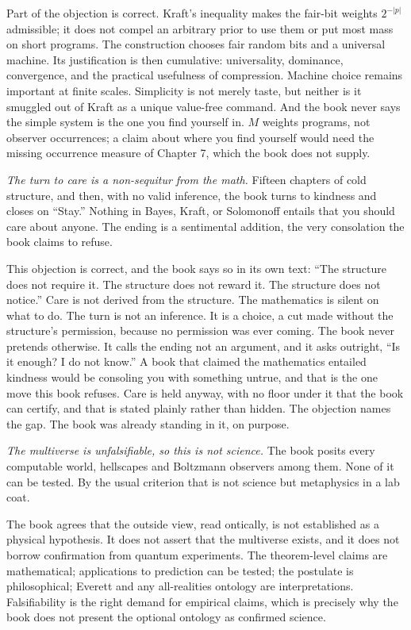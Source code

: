Part of the objection is correct. Kraft's inequality makes the fair-bit weights $2^{-|p|}$ admissible; it does not compel an arbitrary prior to use them or put most mass on short programs. The construction chooses fair random bits and a universal machine. Its justification is then cumulative: universality, dominance, convergence, and the practical usefulness of compression. Machine choice remains important at finite scales. Simplicity is not merely taste, but neither is it smuggled out of Kraft as a unique value-free command. And the book never says the simple system is the one you find yourself in. $M$ weights programs, not observer occurrences; a claim about where you find yourself would need the missing occurrence measure of Chapter 7, which the book does not supply.

\emph{The turn to care is a non-sequitur from the math.} Fifteen chapters of cold structure, and then, with no valid inference, the book turns to kindness and closes on ``Stay.'' Nothing in Bayes, Kraft, or Solomonoff entails that you should care about anyone. The ending is a sentimental addition, the very consolation the book claims to refuse.

This objection is correct, and the book says so in its own text: ``The structure does not require it. The structure does not reward it. The structure does not notice.'' Care is not derived from the structure. The mathematics is silent on what to do. The turn is not an inference. It is a choice, a cut made without the structure's permission, because no permission was ever coming. The book never pretends otherwise. It calls the ending not an argument, and it asks outright, ``Is it enough? I do not know.'' A book that claimed the mathematics entailed kindness would be consoling you with something untrue, and that is the one move this book refuses. Care is held anyway, with no floor under it that the book can certify, and that is stated plainly rather than hidden. The objection names the gap. The book was already standing in it, on purpose.

\emph{The multiverse is unfalsifiable, so this is not science.} The book posits every computable world, hellscapes and Boltzmann observers among them. None of it can be tested. By the usual criterion that is not science but metaphysics in a lab coat.

The book agrees that the outside view, read ontically, is not established as a physical hypothesis. It does not assert that the multiverse exists, and it does not borrow confirmation from quantum experiments. The theorem-level claims are mathematical; applications to prediction can be tested; the postulate is philosophical; Everett and any all-realities ontology are interpretations. Falsifiability is the right demand for empirical claims, which is precisely why the book does not present the optional ontology as confirmed science.

